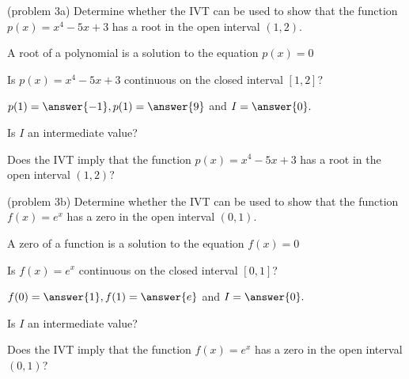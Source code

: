 \documentclass[handout]{ximera}
\begin{document}
\begin{problem}(problem 3a)
Determine whether the IVT can be used to show that the function $p(x) = x^4 - 5x +3$ has a root in the open interval $(1,2)$.\\
\begin{hint}
A root of a polynomial is a solution to the equation $p(x) = 0$
\end{hint}
Is $p(x) = x^4 - 5x + 3$ continuous on the closed interval $[1,2]$? 
\begin{center}
\begin{multipleChoice}
\end{multipleChoice}
\end{center}

$p(1) = \answer{-1}, p(1) = \answer{9}$ and $I = \answer{0}.$

Is $I$ an intermediate value? 
\begin{multipleChoice}
\end{multipleChoice}

Does the IVT imply that the function $p(x) = x^4 - 5x + 3$ has a root in the open interval $(1, 2)$?

\begin{multipleChoice}
\end{multipleChoice}
\end{problem}


\begin{problem}(problem 3b)
Determine whether the IVT can be used to show that the function $f(x) = e^x$ has a zero in the open interval $(0,1)$.
\begin{hint}
A zero of a function is a solution to the equation $f(x) = 0$
\end{hint}
Is $f(x) = e^x$ continuous on the closed interval $[0,1]$? 
\begin{center}
\begin{multipleChoice}
\end{multipleChoice}
\end{center}

$f(0) = \answer{1}, f(1) = \answer{e}$ and $I = \answer{0}.$

Is $I$ an intermediate value? 
\begin{multipleChoice}
\end{multipleChoice}

Does the IVT imply that the function $f(x) = e^x$ has a zero in the open interval $(0, 1)$?

\begin{multipleChoice}
\end{multipleChoice}
\end{problem}
\end{document}
